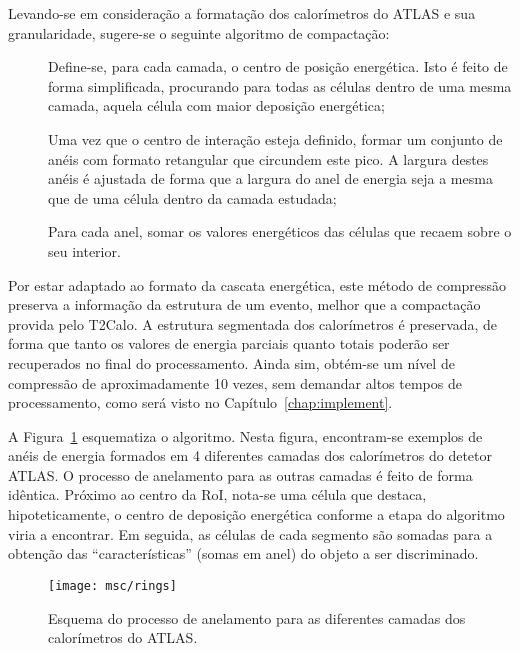 Levando-se em consideração a formatação dos calorímetros do ATLAS e sua
granularidade, sugere-se o seguinte algoritmo de compactação:

\begin{description}
\item[] Define-se, para cada camada, o centro de posição
energética. Isto é feito de forma simplificada, procurando para todas as
células dentro de uma mesma camada, aquela célula com maior deposição
energética;
\item[] Uma vez que o centro de interação esteja definido, formar um
conjunto de anéis com formato retangular que circundem este pico. A largura
destes anéis é ajustada de forma que a largura do anel de energia seja a mesma
que de uma célula dentro da camada estudada;
\item[] Para cada anel, somar os valores energéticos das células que
recaem sobre o seu interior.
\end{description}

Por estar adaptado ao formato da cascata energética, este método de compressão
preserva a informação da estrutura de um evento, melhor que a compactação
provida pelo T2Calo. A estrutura segmentada dos calorímetros é preservada, de
forma que tanto os valores de energia parciais quanto totais poderão ser
recuperados no final do processamento. Ainda sim, obtém-se um nível de
compressão de aproximadamente 10 vezes, sem demandar altos tempos de
processamento, como será visto no Capítulo~\ref{chap:implement}.

A Figura~\ref{fig:rings} esquematiza o algoritmo. Nesta figura, encontram-se
exemplos de anéis de energia formados em 4 diferentes camadas dos calorímetros
do detetor ATLAS. O processo de anelamento para as outras camadas é feito de
forma idêntica. Próximo ao centro da RoI, nota-se uma célula que destaca,
hipoteticamente, o centro de deposição energética conforme a etapa 
do algoritmo viria a encontrar. Em seguida, as células de cada segmento são
somadas para a obtenção das ``características'' (somas em anel) do objeto a
ser discriminado.

\begin{figure}
\begin{center}
\texttt{[image: msc/rings]}
\end{center}
\caption{Esquema do processo de anelamento para as diferentes camadas
dos calorímetros do ATLAS.}
\label{fig:rings}
\end{figure}

